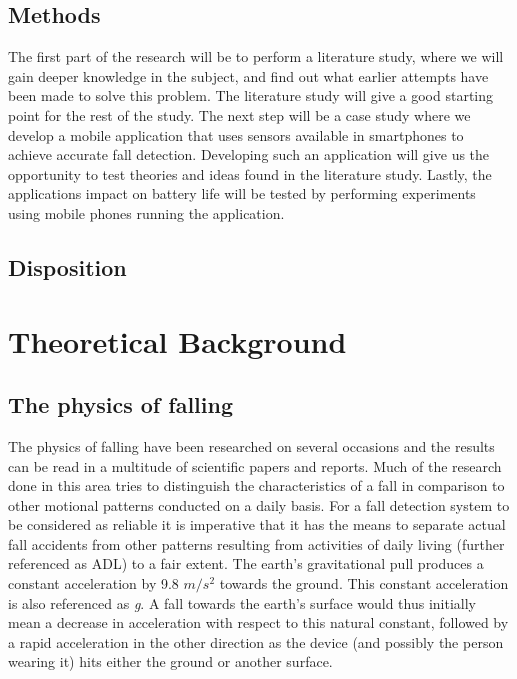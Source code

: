 \documentclass[12pt, a4paper, onecolumn]{article}
\begin{document}
		\subsection{Methods}
		
		The first part of the research will be to perform a literature study, where we will gain deeper knowledge in the subject, and find out what earlier attempts have been made to solve this problem. The literature study will give a good starting point for the rest of the study. The next step will be a case study where we develop a mobile application that uses sensors available in smartphones to achieve accurate fall detection. Developing such an application will give us the opportunity to test theories and ideas found in the literature study. Lastly, the applications impact on battery life will be tested by performing experiments using mobile phones running the application.
		
		\subsection{Disposition}
		
	\newpage
	
	\section{Theoretical Background}
	
	\subsection{The physics of falling}
	The physics of falling have been researched on several occasions and the results can be read in a multitude of scientific papers and reports. Much of the research done in this area tries to distinguish the characteristics of a fall in comparison to other motional patterns conducted on a daily basis. For a fall detection system to be considered as reliable it is imperative that it has the means to separate actual fall accidents from other patterns resulting from activities of daily living (further referenced as ADL) to a fair extent. The earth's gravitational pull produces a constant acceleration by 9.8 $m/s^{2}$ towards the ground. This constant acceleration is also referenced as \textit{g}. A fall towards the earth's surface would thus initially mean a decrease in acceleration with respect to this natural constant, followed by a rapid acceleration in the other direction as the device (and possibly the person wearing it) hits either the ground or another surface.
	
\end{document}
